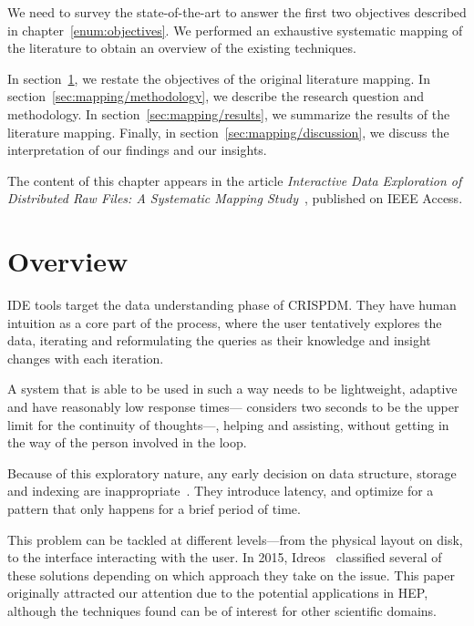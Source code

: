 
We need to survey the state-of-the-art to answer the first two objectives described in
chapter~\ref{enum:objectives}.
We performed an exhaustive systematic mapping of the literature to obtain an overview
of the existing techniques.

In section~\ref{sec:mapping/overview}, we restate the objectives of the original
literature mapping.
In section~\ref{sec:mapping/methodology}, we describe the research question and methodology.
In section~\ref{sec:mapping/results}, we summarize the results of the literature mapping.
Finally, in section~\ref{sec:mapping/discussion}, we discuss the interpretation of our findings and our insights.

The content of this chapter appears in the article
\emph{Interactive Data Exploration of Distributed Raw Files: A Systematic Mapping
Study}~\cite{Alvarez2019}, published on IEEE Access.

\section{Overview}
\label{sec:mapping/overview}
\gls{IDE} tools target the data understanding phase of \gls{CRISPDM}. They have
human intuition as a core part of the process, where the user tentatively
explores the data, iterating and reformulating the queries as
their knowledge and insight changes with each iteration.

A system that is able to be used in such a way needs to be lightweight, adaptive
and have reasonably low response times---\cite{Miller1968} considers two seconds
to be the upper limit for the continuity of thoughts---,
helping and assisting, without getting in the way of the person involved in
the loop.

Because of this exploratory nature, any early decision on data structure,
storage and indexing are inappropriate~\cite{Kersten2011}. They introduce latency,
and optimize for a pattern that only happens for a brief period of time.

This problem can be tackled at different levels---from the physical layout on disk,
to the interface interacting with the user. In 2015, Idreos~\cite{Idreos2015}
classified several of these solutions depending on which approach they take
on the issue. This paper originally attracted our attention  due to the potential
applications in \gls{HEP}\footnotemark, although
the techniques found can be of interest for other scientific domains.

